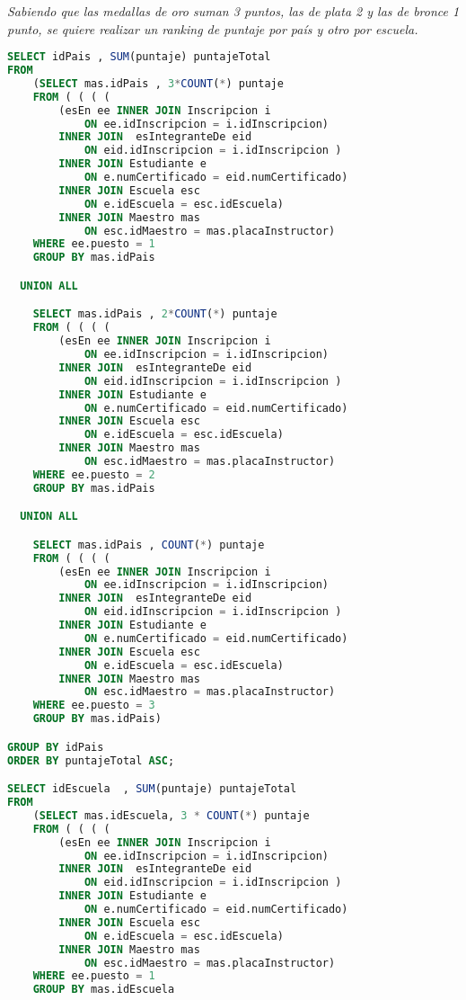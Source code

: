 \emph{Sabiendo que las medallas de oro suman 3 puntos, las de plata 2 y las de bronce 1 punto, se quiere realizar un ranking de puntaje por país y otro por escuela.}
\begin{lstlisting}[language=SQL]
SELECT idPais , SUM(puntaje) puntajeTotal
FROM
    (SELECT mas.idPais , 3*COUNT(*) puntaje
    FROM ( ( ( (
        (esEn ee INNER JOIN Inscripcion i
            ON ee.idInscripcion = i.idInscripcion)
        INNER JOIN  esIntegranteDe eid
            ON eid.idInscripcion = i.idInscripcion )
        INNER JOIN Estudiante e
            ON e.numCertificado = eid.numCertificado)
        INNER JOIN Escuela esc
            ON e.idEscuela = esc.idEscuela)
        INNER JOIN Maestro mas
            ON esc.idMaestro = mas.placaInstructor)
    WHERE ee.puesto = 1
    GROUP BY mas.idPais

  UNION ALL

    SELECT mas.idPais , 2*COUNT(*) puntaje
    FROM ( ( ( (
        (esEn ee INNER JOIN Inscripcion i
            ON ee.idInscripcion = i.idInscripcion)
        INNER JOIN  esIntegranteDe eid
            ON eid.idInscripcion = i.idInscripcion )
        INNER JOIN Estudiante e
            ON e.numCertificado = eid.numCertificado)
        INNER JOIN Escuela esc
            ON e.idEscuela = esc.idEscuela)
        INNER JOIN Maestro mas
            ON esc.idMaestro = mas.placaInstructor)
    WHERE ee.puesto = 2
    GROUP BY mas.idPais

  UNION ALL

    SELECT mas.idPais , COUNT(*) puntaje
    FROM ( ( ( (
        (esEn ee INNER JOIN Inscripcion i
            ON ee.idInscripcion = i.idInscripcion)
        INNER JOIN  esIntegranteDe eid
            ON eid.idInscripcion = i.idInscripcion )
        INNER JOIN Estudiante e
            ON e.numCertificado = eid.numCertificado)
        INNER JOIN Escuela esc
            ON e.idEscuela = esc.idEscuela)
        INNER JOIN Maestro mas
            ON esc.idMaestro = mas.placaInstructor)
    WHERE ee.puesto = 3
    GROUP BY mas.idPais)

GROUP BY idPais
ORDER BY puntajeTotal ASC;

SELECT idEscuela  , SUM(puntaje) puntajeTotal
FROM
    (SELECT mas.idEscuela, 3 * COUNT(*) puntaje
    FROM ( ( ( (
        (esEn ee INNER JOIN Inscripcion i
            ON ee.idInscripcion = i.idInscripcion)
        INNER JOIN  esIntegranteDe eid
            ON eid.idInscripcion = i.idInscripcion )
        INNER JOIN Estudiante e
            ON e.numCertificado = eid.numCertificado)
        INNER JOIN Escuela esc
            ON e.idEscuela = esc.idEscuela)
        INNER JOIN Maestro mas
            ON esc.idMaestro = mas.placaInstructor)
    WHERE ee.puesto = 1
    GROUP BY mas.idEscuela


\end{lstlisting}

